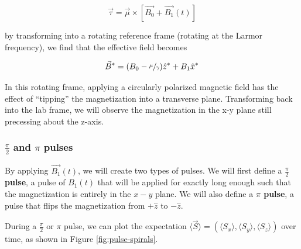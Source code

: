 \documentclass[
    floatfix,  %
    reprint,
    amsmath,
    amssymb,
    aps,
]{revtex4-2}
\newcommand{\halfpi}{\frac{\pi}{2}}
\begin{document}
\begin{equation}
    \vec{\tau} = \vec{\mu} \times  \left[\vec{B_0}+\vec{B_1}(t)\right]
\end{equation}

by transforming into a rotating reference frame (rotating at the Larmor frequency), we find that the effective field becomes

\begin{equation}
    \vec{B}^* = (B_0 - \sfrac{\mu}{\gamma}) \hat{z}^*+ B_1 \hat{x}^*
\end{equation}

In this rotating frame, applying a circularly polarized magnetic field has the effect of ``tipping'' the magnetization into a transverse plane. Transforming back into the lab frame, we will observe the magnetization in the x-y plane still precessing about the z-axis.



\subsubsection{$\halfpi$ and $\pi$ pulses}

By applying $\vec{B_1}(t)$, we will create two types of pulses. We will first define a \textbf{$\halfpi$ pulse}, a pulse of $B_1(t)$ that will be applied for exactly long enough such that the magnetization is entirely in the $x-y$ plane. We will also define a \textbf{$\pi$ pulse}, a pulse that flips the magnetization from $+\hat{z}$ to $-\hat{z}$.


During a $\halfpi$ or $\pi$ pulse, we can plot the expectation $\langle \vec{S} \rangle  = (\langle S_x \rangle, \langle S_y \rangle, \langle S_z \rangle)$ over time, as shown in Figure \ref{fig:pulse-spirals}.
\end{document}
